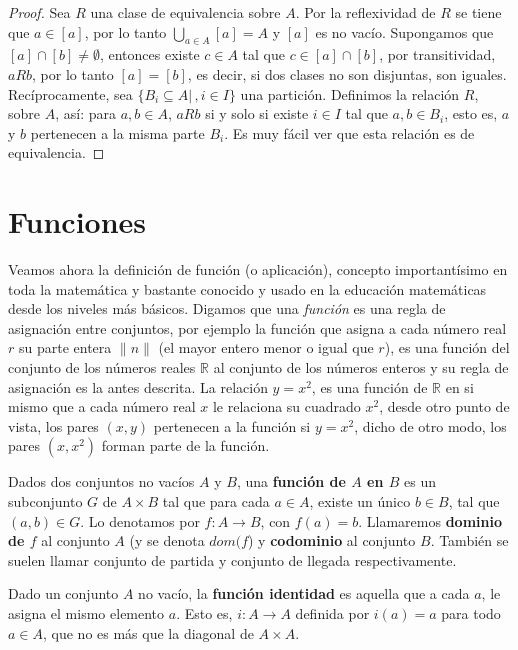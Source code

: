 \documentclass[12pt,]{krantz}
\theoremstyle{definition}
\theoremstyle{definition}
\theoremstyle{definition}
\theoremstyle{remark}
\let\BeginKnitrBlock\begin \let\EndKnitrBlock\end
\begin{document}
\BeginKnitrBlock{proof}
{}Sea \(R\) una clase de equivalencia
sobre \(A\). Por la reflexividad de \(R\) se tiene que \(a\in[a]\), por
lo tanto \(\bigcup_{a\in A} [a]= A\) y \([a]\) es no vacío. Supongamos
que \([a]\cap [b]\neq\emptyset\), entonces existe \(c\in A\) tal que
\(c\in [a]\cap [b]\), por transitividad, \(aRb\), por lo tanto
\([a]=[b]\), es decir, si dos clases no son disjuntas, son iguales.
Recíprocamente, sea \(\{ B_{i}\subseteq A |\,, i\in I\}\) una partición.
Definimos la relación \(R\), sobre \(A\), así: para \(a,b\in A\),
\(aRb\) si y solo si existe \(i\in I\) tal que \(a,b\in B_{i}\), esto
es, \(a\) y \(b\) pertenecen a la misma parte \(B_{i}\). Es muy fácil
ver que esta relación es de equivalencia.
\EndKnitrBlock{proof}

\section{Funciones}\label{funciones}

Veamos ahora la definición de función (o aplicación), concepto
importantísimo en toda la matemática y bastante conocido y usado en la
educación matemáticas desde los niveles más básicos. Digamos que una
\emph{función} es una regla de asignación entre conjuntos, por ejemplo
la función que asigna a cada número real \(r\) su parte entera
\(\lVert n \rVert\) (el mayor entero menor o igual que \(r\)), es una
función del conjunto de los números reales \(\mathbb{R}\) al conjunto de
los números enteros y su regla de asignación es la antes descrita. La
relación \(y=x^{2}\), es una función de \(\mathbb{R}\) en si mismo que a
cada número real \(x\) le relaciona su cuadrado \(x^{2}\), desde otro
punto de vista, los pares \((x,y)\) pertenecen a la función si
\(y=x^{2}\), dicho de otro modo, los pares \((x,x^{2})\) forman parte de
la función.

\BeginKnitrBlock{definition}
\protect\hypertarget{def:unnamed-chunk-28}{}{\label{def:unnamed-chunk-28}
}Dados dos conjuntos no vacíos \(A\) y \(B\), una \textbf{función de
\(A\) en \(B\)} es un subconjunto \(G\) de \(A\times B\) tal que para
cada \(a\in A\), existe un único \(b\in B\), tal que \((a,b)\in G\). Lo
denotamos por \(f: A\longrightarrow B\), con \(f(a)=b\). Llamaremos
\textbf{dominio de \(f\)} al conjunto \(A\) (y se denota \(dom(f\)) y
\textbf{codominio} al conjunto \(B\). También se suelen llamar conjunto
de partida y conjunto de llegada respectivamente.
\EndKnitrBlock{definition}

\BeginKnitrBlock{example}
\protect\hypertarget{exm:identidad}{}{\label{exm:identidad} }Dado un
conjunto \(A\) no vacío, la \textbf{función identidad} es aquella que a
cada \(a\), le asigna el mismo elemento \(a\). Esto es,
\(i: A\longrightarrow A\) definida por \(i(a)=a\) para todo \(a\in A\),
que no es más que la diagonal de \(A\times A\).
\EndKnitrBlock{example}
\end{document}
